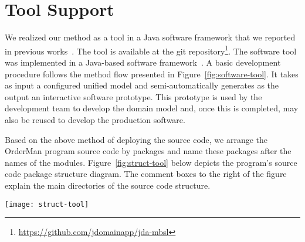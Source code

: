 \section{Tool Support}
\label{sect:tool} %
We realized our method as a tool in a Java software framework that we reported in previous works~\cite{le_domain_2018}. The tool is available at the git repository\footnote{\url{https://github.com/jdomainapp/jda-mbsl}}. The software tool was implemented in a Java-based software framework~\cite{le_jdomainapp_2017}. A basic development procedure follows the method flow presented in Figure~\ref{fig:software-tool}. It takes as input a configured unified model and semi-automatically generates as the output an interactive software prototype. This prototype is used by the development team to develop the domain model and, once this is completed, may also be reused to develop the production software.
%


Based on the above method of deploying the source code, we arrange the OrderMan program source code by packages and name these packages after the names of the modules. Figure~\ref{fig:struct-tool} below depicts the program's source code package structure diagram. The comment boxes to the right of the figure explain the main directories of the source code structure.
%
\begin{figure*}[ht]
	\centering
	\texttt{[image: struct-tool]}
	\caption{Structure diagram of the program source code} %
	\label{fig:struct-tool}
\end{figure*}
%

